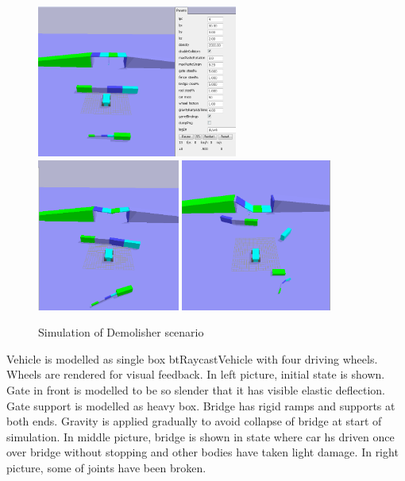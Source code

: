 \begin{figure}[htb!]
\centering
\includegraphics[height=5cm]{figs/demolisher-pre}
\includegraphics[height=5cm]{figs/demolisher-wip}
\includegraphics[height=5cm]{figs/demolisher-done}
\caption{Simulation of Demolisher scenario}
\label{fig:demolisher}
\end{figure}

Vehicle is modelled as single box btRaycastVehicle with four driving wheels. Wheels are rendered for visual feedback.
In left picture, initial state is shown. Gate in front is modelled to be so slender that it has visible elastic deflection.
Gate support is modelled as heavy box.
Bridge has rigid ramps and supports at both ends.
Gravity is applied gradually to avoid collapse of bridge at start of simulation.
In middle picture,  bridge is shown in state where car hs driven once over bridge without stopping and
other bodies have taken light damage.
In right picture, some of joints have been broken.

